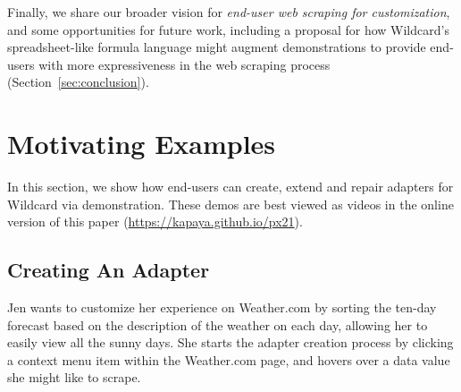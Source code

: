 \documentclass[sigconf,10pt]{acmart}
\begin{document}
Finally, we share our broader vision for \emph{end-user web scraping for
customization}, and some opportunities for future work, including a
proposal for how Wildcard's spreadsheet-like formula language might
augment demonstrations to provide end-users with more expressiveness in
the web scraping process (Section~\ref{sec:conclusion}).

\hypertarget{sec:demos}{%
\section{Motivating Examples}\label{sec:demos}}

In this section, we show how end-users can create, extend and repair
adapters for Wildcard via demonstration.{ These demos are best viewed as
videos in the online version of this paper
(\url{https://kapaya.github.io/px21}).}

\hypertarget{creating-an-adapter}{%
\subsection{Creating An Adapter}\label{creating-an-adapter}}

Jen wants to customize her experience on Weather.com by sorting the
ten-day forecast based on the description of the weather on each day,
allowing her to easily view all the sunny days. She starts the adapter
creation process by clicking a context menu item within the Weather.com
page, and hovers over a data value she might like to scrape.
\end{document}
